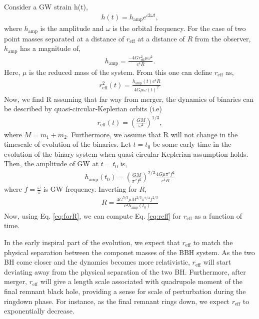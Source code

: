 Consider a GW strain h(t), 
\begin{align}
h(t) =h_{\mathrm{amp}} e^{\iota 2\omega t}, 
\end{align}
where $h_{\mathrm{amp}}$ is the amplitude and $\omega$ is the orbital frequency. For the case of two point masses separated at a distance of $r_{\mathrm{eff}}$ at a distance of $R$ from the observer, $h_{\mathrm{amp}}$ has a magnitude of,    
\begin{align}
h_{\mathrm{amp}}=\frac{-4G r_{\mathrm{eff}}^{2} \mu \omega^{2}}{c^{4} R}.
\end{align}
Here, $\mu$ is the reduced mass of the system. From this one can define $r_{\mathrm{eff}}$ as, 
\begin{align}
\label{eq:reff}
r_{\mathrm{eff}}^{2}(t)=\frac{h_{\mathrm{amp}}(t) c^{4} R}{ 4 G \mu \omega(t)^{2}}
\end{align}
Now, we find R assuming that far way from merger, the dynamics of binaries can be described by quasi-circular-Keplerian orbits (i.e)
\begin{align}
r_{\mathrm{eff}}(t)=\left( \frac{G M}{\omega^{2}} \right)^{1/3},
\end{align}
where $M=m_{1}+m_{2}$. Furthermore, we assume that R will not change in the timescale of evolution of the binaries. 
Let $t=t_{0}$ be some early time in the evolution of the binary system when quasi-circular-Keplerian assumption holds. Then, the amplitude of GW at $t=t_{0}$ is,
\begin{align}
h_{\mathrm{amp}}(t_{0})=  \left( \frac{G M}{\pi^{2} f^{2}} \right)^{2/3} \frac{4 G \mu  \pi^{2}f^{2}}{c^{4} R}
\end{align}
where $f=\frac{\omega}{\pi}$ is GW frequency.
Inverting for $R$, 
\begin{align}
\label{eq:forR}
R=\frac{4 G^{5/3} \mu M^{2/3} \pi^{2/3} f^{2/3}}{c^{4} h_{\mathrm{amp}}(t_{0})}
\end{align}
Now, using Eq. \ref{eq:forR}, we can compute Eq. \ref{eq:reff} for $r_{\mathrm{eff}}$ as a function of time. 

In the early inspiral part of the evolution, we expect that $r_{\mathrm{eff}}$ to match the physical separation between the componet masses of the BBH system. As the two BH come closer and the dynamics becomes more relativistic, $r_{\mathrm{eff}}$ will start deviating away from the physical separation of the two BH. Furthermore, after merger, $r_{\mathrm{eff}}$ will give a length scale associated with quadrupole moment of the final remnant black hole, providing a sense for scale of perturbation during the ringdown phase. For instance, as the final remnant rings down, we expect $r_{\mathrm{eff}}$ to exponentially decrease. 

